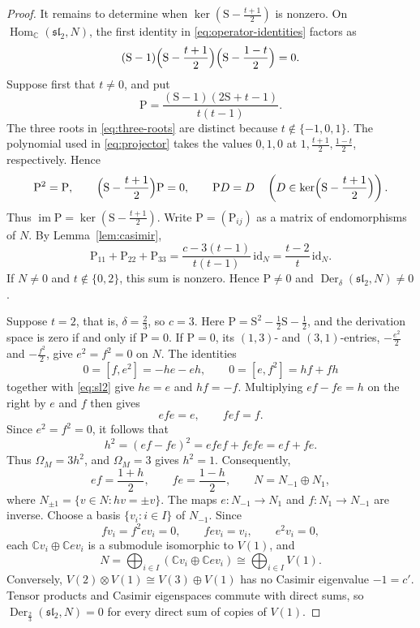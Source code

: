 \documentclass[11pt,reqno]{amsart}
\numberwithin{equation}{section}
\newcommand{\C}{\mathbb C}
\newcommand{\s}{\mathfrak{sl}_2}
\DeclareMathOperator{\Der}{Der}
\DeclareMathOperator{\Hom}{Hom}
\DeclareMathOperator{\im}{im}
\theoremstyle{definition}
\theoremstyle{remark}
\begin{document}
\begin{proof}
It remains to determine when \(\ker(\mathrm{S}-\frac{t+1}{2})\) is nonzero.
On \(\Hom_\C(\s,N)\), the first identity in
\eqref{eq:operator-identities} factors as
\begin{equation}\label{eq:three-roots}
(\mathrm{S}-1)\Bigl(\mathrm{S}-\frac{t+1}{2}\Bigr)
\Bigl(\mathrm{S}-\frac{1-t}{2}\Bigr)=0.
\end{equation}
Suppose first that \(t\ne0\), and put
\begin{equation}\label{eq:projector}
\mathrm{P}=\frac{(\mathrm{S}-1)(2\mathrm{S}+t-1)}{t(t-1)}.
\end{equation}
The three roots in \eqref{eq:three-roots} are distinct because
\(t\notin\{-1,0,1\}\). The polynomial used in
\eqref{eq:projector} takes the values \(0,1,0\) at
\(1,\frac{t+1}{2},\frac{1-t}{2}\), respectively. Hence
\[
\mathrm{P}^2=\mathrm{P},\qquad
\Bigl(\mathrm{S}-\frac{t+1}{2}\Bigr)\mathrm{P}=0,\qquad
\mathrm{P}D=D\quad
\left(D\in\ker\Bigl(\mathrm{S}-\frac{t+1}{2}\Bigr)\right).
\]
Thus \(\im \mathrm{P}=\ker(\mathrm{S}-\frac{t+1}{2})\).
Write \(\mathrm{P}=(\mathrm{P}_{ij})\) as a matrix of endomorphisms of \(N\).
By Lemma~\ref{lem:casimir},
\begin{equation}\label{eq:partial-trace}
\mathrm{P}_{11}+\mathrm{P}_{22}+\mathrm{P}_{33}
=\frac{c-3(t-1)}{t(t-1)}\,\mathrm{id}_N
=\frac{t-2}{t}\,\mathrm{id}_N.
\end{equation}
If \(N\ne0\) and \(t\notin\{0,2\}\), this sum is nonzero.
Hence \(\mathrm{P}\ne0\) and \(\Der_\delta(\s,N)\ne0\).

Suppose \(t=2\), that is, \(\delta=\frac{2}{3}\), so \(c=3\).
Here \(\mathrm{P}=\mathrm{S}^2-\frac{1}{2}\mathrm{S}-\frac{1}{2}\),
and the derivation space is zero if and only if \(\mathrm{P}=0\).
If \(\mathrm{P}=0\), its \((1,3)\)- and \((3,1)\)-entries,
\(-\frac{e^2}{2}\) and \(-\frac{f^2}{2}\), give \(e^2=f^2=0\) on \(N\).
The identities
\[
0=[f,e^2]=-he-eh,\qquad 0=[e,f^2]=hf+fh
\]
together with \eqref{eq:sl2} give \(he=e\) and \(hf=-f\).
Multiplying \(ef-fe=h\)
on the right by \(e\) and \(f\) then gives
\[
efe=e,\qquad fef=f.
\]
Since \(e^2=f^2=0\), it follows that
\[
h^2=(ef-fe)^2=efef+fefe=ef+fe.
\]
Thus \(\Omega_M=3h^2\), and \(\Omega_M=3\) gives \(h^2=1\).
Consequently,
\[
ef=\frac{1+h}{2},\qquad fe=\frac{1-h}{2},\qquad
N=N_{-1}\oplus N_1,
\]
where \(N_{\pm1}=\{v\in N:hv=\pm v\}\).
The maps \(e:N_{-1}\to N_1\) and
\(f:N_1\to N_{-1}\) are inverse. Choose a basis
\(\{v_i:i\in I\}\) of \(N_{-1}\). Since
\[
fv_i=f^2ev_i=0,\qquad fev_i=v_i,\qquad e^2v_i=0,
\]
each \(\C v_i\oplus\C ev_i\) is a submodule isomorphic to
\(V(1)\), and
\[
N=\bigoplus_{i\in I}(\C v_i\oplus\C ev_i)
\cong\bigoplus_{i\in I}V(1).
\]
Conversely, \(V(2)\otimes V(1)\cong V(3)\oplus V(1)\)
has no Casimir eigenvalue \(-1=c'\). Tensor products and
Casimir eigenspaces commute with direct sums, so
\(\Der_{\frac{2}{3}}(\s,N)=0\) for every direct sum of copies of \(V(1)\).


\end{proof}
\end{document}
